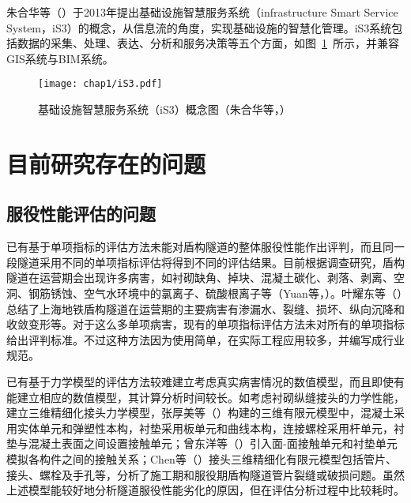 朱合华等（\citeyear{朱合华2018智慧基础设施}）于2013年提出基础设施智慧服务系统（infrastructure Smart Service System，iS3）的概念，从信息流的角度，实现基础设施的智慧化管理。iS3系统包括数据的采集、处理、表达、分析和服务决策等五个方面，如图~\ref{fig:iS3概念图}~所示，并兼容GIS系统与BIM系统。

\begin{figure}[!h]
	\centering
	\texttt{[image: chap1/iS3.pdf]}
	\caption{基础设施智慧服务系统（iS3）概念图（朱合华等，\citeyear{朱合华2018智慧基础设施}）}
	\label{fig:iS3概念图}
\end{figure}

\section{目前研究存在的问题}

\subsection{服役性能评估的问题}

已有基于单项指标的评估方法未能对盾构隧道的整体服役性能作出评判，而且同一段隧道采用不同的单项指标评估将得到不同的评估结果。目前根据调查研究，盾构隧道在运营期会出现许多病害，如衬砌缺角、掉块、混凝土碳化、剥落、剥离、空洞、钢筋锈蚀、空气水环境中的氯离子、硫酸根离子等（Yuan等，\citeyear{yuan2013predictive}）。叶耀东等（\citeyear{叶耀东2007软土地铁运营隧道病害现状及成因分析}）总结了上海地铁盾构隧道在运营期的主要病害有渗漏水、裂缝、损坏、纵向沉降和收敛变形等。对于这么多单项病害，现有的单项指标评估方法未对所有的单项指标给出评判标准。不过这种方法因为使用简单，在实际工程应用较多，并编写成行业规范。

已有基于力学模型的评估方法较难建立考虑真实病害情况的数值模型，而且即使有能建立相应的数值模型，其计算分析时间较长。如考虑衬砌纵缝接头的力学性能，建立三维精细化接头力学模型，张厚美等（\citeyear{张厚美2000圆形隧道装配式衬砌接头刚度模型研究}）构建的三维有限元模型中，混凝土采用实体单元和弹塑性本构，衬垫采用板单元和曲线本构，连接螺栓采用杆单元，衬垫与混凝土表面之间设置接触单元；曾东洋等（\citeyear{曾东洋2005地铁盾构隧道管片接头刚度影响因素研究}）引入面-面接触单元和衬垫单元模拟各构件之间的接触关系；Chen等（\citeyear{chen2009numerical}）接头三维精细化有限元模型包括管片、接头、螺栓及手孔等，分析了施工期和服役期盾构隧道管片裂缝或破损问题。虽然上述模型能较好地分析隧道服役性能劣化的原因，但在评估分析过程中比较耗时。

